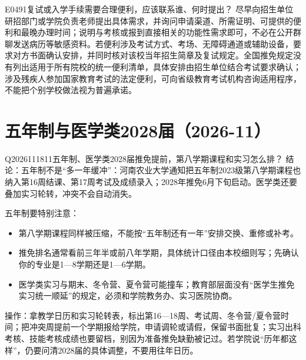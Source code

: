 
\begin{qa}{E0491}{复试或入学手续需要合理便利，应该联系谁、何时提出？}
尽早向招生单位研招部门或学院负责老师提出具体需求，并询问申请渠道、所需证明、可提供的便利和最晚办理时间；说明与考核或报到直接相关的功能性需求即可，不必在公开群聊发送病历等敏感资料。若便利涉及考试方式、考场、无障碍通道或辅助设备，要求对方书面确认安排，并同时核对该校当年招生简章及复试规定。全国推免规定没有列出适用于所有院校的统一便利清单，具体安排由招生单位结合考试要求确认；涉及残疾人参加国家教育考试的法定便利，可向省级教育考试机构咨询适用程序，不能把个别学校做法视为普遍承诺。
\end{qa}
\section{五年制与医学类2028届（2026-11）}

\begin{qa}{Q2026111811}{五年制、医学类2028届推免提前，第八学期课程和实习怎么排？}
结论：五年制不是“多一年缓冲”：河南农业大学通知把五年制2023级第八学期课程也纳入第16周结课、第17周考试及成绩录入；2028年推免6月下旬启动。医学类还要叠加实习轮转，冲突不会自动消失。

五年制要特别注意：

\begin{itemize}
\item 第八学期课程同样被压缩，不能按“五年制还有一年”安排交换、重修或补考。
\item 推免排名通常看前三年半或前八年学期，具体统计口径由本校细则写；先确认你的专业是1—8学期还是1—6学期。
\item 医学类实习与期末、冬令营、夏令营可能撞车；教育部层面没有“医学生推免实习统一顺延”的规定，必须和学院教务办、实习医院协商。
\end{itemize}

操作：拿教学日历和实习轮转表，标出第16—18周、考试周、冬令营/夏令营时间；把冲突周提前一个学期报给学院，申请调轮或请假，保留书面批复；实习出科考核、技能考核成绩也要留档，别因为准备推免缺勤被记过。若学院说“历年都这样”，仍要问清2028届的具体调整，不要用往年日历。
\end{qa}
